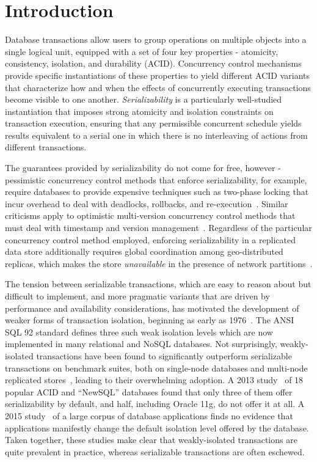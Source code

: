 
\section{Introduction}

Database transactions allow users to group operations on multiple
objects into a single logical unit, equipped with a set of four key
properties - atomicity, consistency, isolation, and durability (ACID).
Concurrency control mechanisms provide specific instantiations of
these properties to yield different ACID variants that characterize
how and when the effects of concurrently executing transactions become
visible to one another.  \emph{Serializability} is a particularly
well-studied instantiation that imposes strong atomicity and isolation
constraints on transaction execution, ensuring that any permissible
concurrent schedule yields results equivalent to a serial one in which
there is no interleaving of actions from different transactions.

The guarantees provided by serializability do not come for free,
however - pessimistic concurrency control methods that enforce
serializability, for example, require databases to provide expensive
techniques such as two-phase locking that incur overhead to deal with
deadlocks, rollbacks, and re-execution~\cite{twopl,ullmanbook}.
Similar criticisms apply to optimistic multi-version concurrency
control methods that must deal with timestamp and version
management~\cite{BG81}.  Regardless of the particular concurrency
control method employed, enforcing serializability in a replicated
data store additionally requires global coordination among
geo-distributed replicas, which makes the store \emph{unavailable} in
the presence of network
partitions~\cite{cap,sernotavlbl,bailishat,bernsigmod13}.

The tension between serializable transactions, which are easy to
reason about but difficult to implement, and more pragmatic variants
that are driven by performance and availability considerations, has
motivated the development of weaker forms of transaction isolation,
beginning as early as 1976~\cite{gray1976}. The ANSI SQL 92 standard
defines three such weak isolation levels which are now implemented in
many relational and NoSQL databases. Not surprisingly, weakly-isolated
transactions have been found to significantly outperform serializable
transactions on benchmark suites, both on single-node databases and
multi-node replicated stores~\cite{dbtuningbook,bailishat,bailisvldb},
leading to their overwhelming adoption. A 2013
study~\cite{bailishotos} of 18 popular ACID and ``NewSQL'' databases
found that only three of them offer serializability by default, and
half, including Oracle 11g, do not offer it at all.  A 2015
study~\cite{bailisferal} of a large corpus of database applications
finds no evidence that applications manifestly change the default
isolation level offered by the database. Taken together, these studies
make clear that weakly-isolated transactions are quite prevalent in
practice, whereas serializable transactions are often eschewed.

